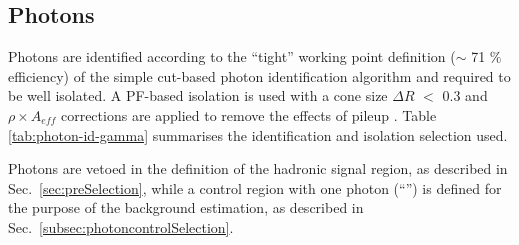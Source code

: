 


\subsection{Photons}
\label{sec:photon-id}
Photons are identified according to the ``tight'' working point definition ($\sim$ 71 $\%$ efficiency) 
of the simple cut-based photon identification algorithm \cite{photon-id} 
and required to be well isolated. 
A PF-based isolation is used with a cone size $\Delta R$ $<$ 0.3 and
$\rho\times A_{eff}$ corrections are applied to remove the effects of pileup \cite{pf-photon}. 
Table \ref{tab:photon-id-gamma} summarises the identification and isolation selection used. 

Photons are vetoed in the definition of the hadronic signal region, 
as described in Sec.~\ref{sec:preSelection}, while a 
control region with one photon (``\gj'') is defined for the purpose of the background estimation, 
as described in Sec.~\ref{subsec:photoncontrolSelection}.


